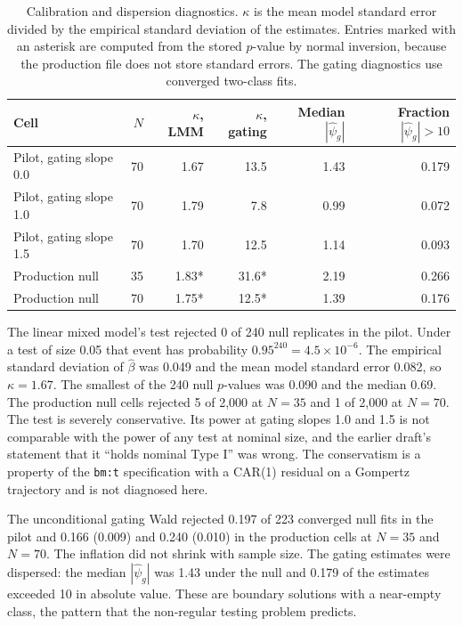 \documentclass[
  11pt,
]{article}
\begin{document}
\begin{table}[!h]
\centering
\caption{\label{tab:stored-diag}Calibration and dispersion diagnostics. $\kappa$ is the mean model standard error divided by the empirical standard deviation of the estimates. Entries marked with an asterisk are computed from the stored $p$-value by normal inversion, because the production file does not store standard errors. The gating diagnostics use converged two-class fits.}
\centering
\fontsize{8}{10}\selectfont
\begin{tabular}[t]{>{\raggedright\arraybackslash}p{2.6cm}rrrrr}
\toprule
Cell & $N$ & $\kappa$, LMM & $\kappa$, gating & Median $|\hat\psi_g|$ & Fraction $|\hat\psi_g| > 10$\\
\midrule
Pilot, gating slope 0.0 & 70 & 1.67 & 13.5 & 1.43 & 0.179\\
Pilot, gating slope 1.0 & 70 & 1.79 & 7.8 & 0.99 & 0.072\\
Pilot, gating slope 1.5 & 70 & 1.70 & 12.5 & 1.14 & 0.093\\
Production null & 35 & 1.83* & 31.6* & 2.19 & 0.266\\
Production null & 70 & 1.75* & 12.5* & 1.39 & 0.176\\
\bottomrule
\end{tabular}
\end{table}

The linear mixed model's test rejected 0 of 240 null replicates in
the pilot. Under a test of size 0.05 that event has probability
\(0.95^{240} = 4.5 \times 10^{-6}\). The empirical standard deviation of
\(\hat\beta\) was 0.049 and the mean model
standard error 0.082, so
\(\kappa = 1.67\). The
smallest of the 240 null \(p\)-values was
0.090 and the median
0.69. The production null cells rejected
5 of 2,000
at \(N = 35\) and 1 of
2,000 at \(N = 70\). The
test is severely conservative. Its power at gating slopes 1.0 and 1.5
is not comparable with the power of any test at nominal size, and the
earlier draft's statement that it ``holds nominal Type I'' was wrong.
The conservatism is a property of the \texttt{bm:t} specification with a
CAR(1) residual on a Gompertz trajectory and is not diagnosed here.

The unconditional gating Wald rejected
0.197 of 223 converged
null fits in the pilot and 0.166 (0.009) and 0.240 (0.010)
in the production cells at \(N = 35\) and \(N = 70\). The inflation did
not shrink with sample size. The gating estimates were dispersed: the
median \(|\hat\psi_g|\) was 1.43 under the null and
0.179 of the estimates exceeded 10 in absolute value.
These are boundary solutions with a near-empty class, the pattern that
the non-regular testing problem predicts.
\end{document}
